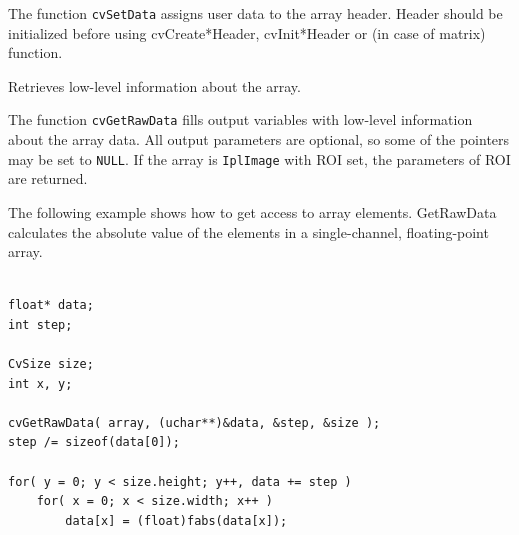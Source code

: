 
\begin{description}
\end{description}


The function \texttt{cvSetData} assigns user data to the array header. Header should be initialized before using cvCreate*Header, cvInit*Header or  (in case of matrix) function.

\label{GetRawData}

Retrieves low-level information about the array.


\begin{description}
\end{description}

The function \texttt{cvGetRawData} fills output variables with low-level information about the array data. All output parameters are optional, so some of the pointers may be set to \texttt{NULL}. If the array is \texttt{IplImage} with ROI set, the parameters of ROI are returned.

The following example shows how to get access to array elements. GetRawData calculates the absolute value of the elements in a single-channel, floating-point array.

\begin{lstlisting}

float* data;
int step;

CvSize size;
int x, y;

cvGetRawData( array, (uchar**)&data, &step, &size );
step /= sizeof(data[0]);

for( y = 0; y < size.height; y++, data += step )
    for( x = 0; x < size.width; x++ )
        data[x] = (float)fabs(data[x]);

\end{lstlisting}


\label{GetMat}

